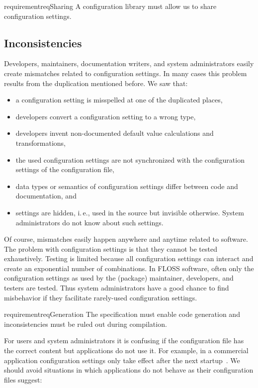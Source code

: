 \begin{restatable}{requirement}{reqSharing}
A configuration library must allow us to share configuration settings.%
\label{req:sharing}
\end{restatable}


\subsection{Inconsistencies}

Developers, maintainers, documentation writers, and system administrators easily create mismatches related to configuration settings.
In many cases this problem results from the duplication mentioned before.
We saw that:

\begin{itemize}
\item a configuration setting is misspelled at one of the duplicated places,
\item developers convert a configuration setting to a wrong type,
\item developers invent non-documented default value calculations and transformations,
\item the used configuration settings are not synchronized with the configuration settings of the configuration file,
\item data types or semantics of configuration settings differ between code and documentation, and
\item settings are hidden, i.\,e., used in the source but invisible otherwise.
System administrators do not know about such settings.
\end{itemize}

Of course, mismatches easily happen anywhere and anytime related to software.
The problem with configuration settings is that they cannot be tested exhaustively.
Testing is limited because all configuration settings can interact and create an exponential number of combinations.
In FLOSS software, often only the configuration settings as used by the (package) maintainer, developers, and testers are tested.
Thus system administrators have a good chance to find misbehavior if they facilitate rarely-used configuration settings.

\begin{restatable}{requirement}{reqGeneration}
The specification must enable code generation and inconsistencies must be ruled out during compilation.
\end{restatable}

For users and system administrators it is confusing if the configuration file has the correct content but applications do not use it.
For example, in a commercial application configuration settings only take effect after the next startup~\cite{jin2014configurations}.
We should avoid situations in which applications do not behave as their configuration files suggest:

